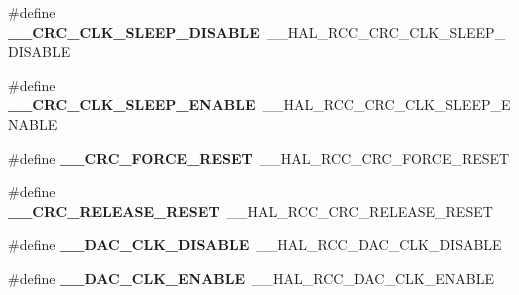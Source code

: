 \begin{DoxyCompactItemize}
\item 
\hypertarget{group___h_a_l___r_c_c___aliased_gaada0cd2d2a82866dccf1340de75e3c45}{\#define {\bfseries \-\_\-\-\_\-\-C\-R\-C\-\_\-\-C\-L\-K\-\_\-\-S\-L\-E\-E\-P\-\_\-\-D\-I\-S\-A\-B\-L\-E}~\-\_\-\-\_\-\-H\-A\-L\-\_\-\-R\-C\-C\-\_\-\-C\-R\-C\-\_\-\-C\-L\-K\-\_\-\-S\-L\-E\-E\-P\-\_\-\-D\-I\-S\-A\-B\-L\-E}\label{group___h_a_l___r_c_c___aliased_gaada0cd2d2a82866dccf1340de75e3c45}

\item 
\hypertarget{group___h_a_l___r_c_c___aliased_ga8ffcd0f32b2bec3cf768fb881b67848c}{\#define {\bfseries \-\_\-\-\_\-\-C\-R\-C\-\_\-\-C\-L\-K\-\_\-\-S\-L\-E\-E\-P\-\_\-\-E\-N\-A\-B\-L\-E}~\-\_\-\-\_\-\-H\-A\-L\-\_\-\-R\-C\-C\-\_\-\-C\-R\-C\-\_\-\-C\-L\-K\-\_\-\-S\-L\-E\-E\-P\-\_\-\-E\-N\-A\-B\-L\-E}\label{group___h_a_l___r_c_c___aliased_ga8ffcd0f32b2bec3cf768fb881b67848c}

\item 
\hypertarget{group___h_a_l___r_c_c___aliased_gac941965d29951a88423ecb539ce31beb}{\#define {\bfseries \-\_\-\-\_\-\-C\-R\-C\-\_\-\-F\-O\-R\-C\-E\-\_\-\-R\-E\-S\-E\-T}~\-\_\-\-\_\-\-H\-A\-L\-\_\-\-R\-C\-C\-\_\-\-C\-R\-C\-\_\-\-F\-O\-R\-C\-E\-\_\-\-R\-E\-S\-E\-T}\label{group___h_a_l___r_c_c___aliased_gac941965d29951a88423ecb539ce31beb}

\item 
\hypertarget{group___h_a_l___r_c_c___aliased_gaa29b35e6b9f42b156e326efbb353b8f2}{\#define {\bfseries \-\_\-\-\_\-\-C\-R\-C\-\_\-\-R\-E\-L\-E\-A\-S\-E\-\_\-\-R\-E\-S\-E\-T}~\-\_\-\-\_\-\-H\-A\-L\-\_\-\-R\-C\-C\-\_\-\-C\-R\-C\-\_\-\-R\-E\-L\-E\-A\-S\-E\-\_\-\-R\-E\-S\-E\-T}\label{group___h_a_l___r_c_c___aliased_gaa29b35e6b9f42b156e326efbb353b8f2}

\item 
\hypertarget{group___h_a_l___r_c_c___aliased_ga8c9160056752d1daf7a39b2e4560eb9d}{\#define {\bfseries \-\_\-\-\_\-\-D\-A\-C\-\_\-\-C\-L\-K\-\_\-\-D\-I\-S\-A\-B\-L\-E}~\-\_\-\-\_\-\-H\-A\-L\-\_\-\-R\-C\-C\-\_\-\-D\-A\-C\-\_\-\-C\-L\-K\-\_\-\-D\-I\-S\-A\-B\-L\-E}\label{group___h_a_l___r_c_c___aliased_ga8c9160056752d1daf7a39b2e4560eb9d}

\item 
\hypertarget{group___h_a_l___r_c_c___aliased_ga702a2f0ecb75be8f6b277f0b344f92de}{\#define {\bfseries \-\_\-\-\_\-\-D\-A\-C\-\_\-\-C\-L\-K\-\_\-\-E\-N\-A\-B\-L\-E}~\-\_\-\-\_\-\-H\-A\-L\-\_\-\-R\-C\-C\-\_\-\-D\-A\-C\-\_\-\-C\-L\-K\-\_\-\-E\-N\-A\-B\-L\-E}\label{group___h_a_l___r_c_c___aliased_ga702a2f0ecb75be8f6b277f0b344f92de}


\end{DoxyCompactItemize}
